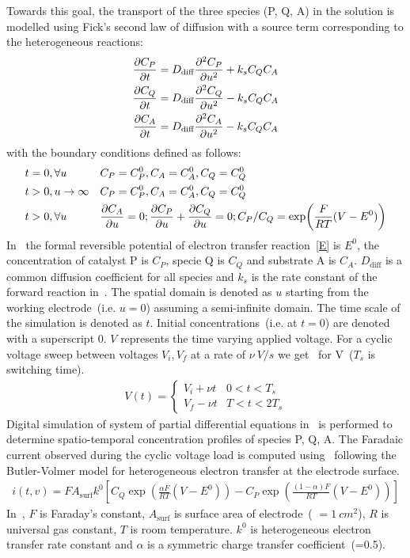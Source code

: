 Towards this goal, the transport of the three species (P, Q, A) in the solution is modelled using Fick's second law of diffusion with a source term corresponding to the heterogeneous reactions:
\begin{align}
    \pdv{C_P}{t} &= D_{\text{diff}}\pdv[2]{C_P}{u} + k_{s}C_{Q}C_{A} \nonumber\\
    \pdv{C_Q}{t} &= D_{\text{diff}}\pdv[2]{C_Q}{u} - k_{s}C_{Q}C_{A} \nonumber\\
    \pdv{C_A}{t} &= D_{\text{diff}}\pdv[2]{C_A}{u} - k_{s}C_{Q}C_{A} \label{eq:fickslaws}
\end{align}
with the boundary conditions defined as follows:
\begin{align}
    t&=0, \forall u &  &C_P = C^0_{P}, C_A = C^0_{A}, C_Q = C^0_{Q} \nonumber \\
    t&>0, u\rightarrow \infty &  &C_P = C^0_{P}, C_A = C^0_{A}, C_Q = C^0_{Q}  \nonumber\\
    t&>0, \forall u &  &\pdv{C_A}{u}=0; \pdv{C_P}{u}+\pdv{C_Q}{u}=0; C_P/C_Q = \exp(\frac{F}{RT}(V-E^0)) \label{eq:bcs}
\end{align}
In~ the formal reversible potential of electron transfer reaction~\cref{E} is \(E^0\), the  concentration of catalyst P is \(C_P\), specie Q is \(C_Q\) and substrate A is \(C_A\). \(D_{\text{diff}}\) is a common diffusion coefficient for all species and \(k_{s}\) is the rate constant of the forward reaction in~. 
The spatial domain is denoted as \(u\) starting from the working electrode~(i.e. \(u=0\)) assuming a semi-infinite domain. The time scale of the simulation is denoted as \(t\). Initial concentrations~(i.e. at \(t=0\)) are denoted with a superscript 0. \(V\) represents the time varying applied voltage. 
For a cyclic voltage sweep between voltages \(V_i, V_f\) at a rate of \(\nu~V/s\) we get~ for V~(\(T_s\) is switching time).
\begin{align}\label{eq:voltage_scan}
    V(t) = 
    \begin{cases}
        V_i + \nu t & 0<t<T_s\\
        V_f - \nu t & T<t<2T_s
    \end{cases}
\end{align}
Digital simulation of system of partial differential equations in~ is performed to determine spatio-temporal concentration profiles of species P, Q, A. 
The Faradaic current observed during the cyclic voltage load is computed using~ following the Butler-Volmer model for heterogeneous electron transfer at the electrode surface.
\begin{align}\label{eq:current}
    i(t,v) = FA_{\text{surf}}k^0\left[C_Q\exp(\frac{\alpha F}{RT}(V-E^0)) - C_P\exp(\frac{(1-\alpha)F}{RT}(V-E^0))\right]
\end{align}
In~, \(F\) is Faraday's constant, \(A_{\text{surf}}\) is surface area of electrode~( \(=1~cm^2\)), \(R\) is universal gas constant, \(T\) is room temperature.
\(k^0\) is heterogeneous electron transfer rate constant and \(\alpha\) is a symmetric charge transfer coefficient~(=0.5).
    
